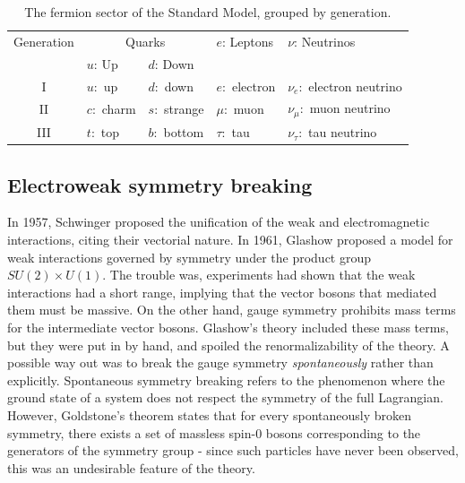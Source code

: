\begin{table}
  \raggedright
\strictpagecheck
\begin{adjustwidth}{-0.5in}{0in}
  \begin{tabular}{cllll}
    \toprule
    Generation & \multicolumn{2}{c}{Quarks} & $e$: Leptons & $\nu$: Neutrinos \\ \cmidrule(r){2-3}
     & $u$: Up & $d$: Down &                                       & \\\midrule
    I           & $u:$ up                    & $d:$ down     & $e:$ electron                         & $\nu_e:$ electron neutrino\\
    II          & $c:$ charm                 & $s:$ strange  & $\mu:$ muon                           & $\nu_\mu:$ muon neutrino\\
    III         & $t:$ top                   & $b:$ bottom   & $\tau:$ tau                           & $\nu_\tau:$ tau neutrino\\
    \bottomrule
  \end{tabular}
  \caption{The fermion sector of the Standard Model, grouped by generation.}
  \label{tab:fermion_generations}
\end{adjustwidth}
\end{table}
\subsection{Electroweak symmetry breaking}\label{subsec:ewsb}
In 1957, Schwinger proposed the unification of the weak and electromagnetic interactions, citing their vectorial nature. In 1961, Glashow proposed a model for weak interactions governed by symmetry under the product group $SU(2)\times U(1)$. The trouble was, experiments had shown that the weak interactions had a short range, implying that the vector bosons that mediated them must be massive. On the other hand, gauge symmetry prohibits mass terms for the intermediate vector bosons. Glashow's theory included these mass terms, but they were put in by hand, and spoiled the renormalizability of the theory. A possible way out was to break the gauge symmetry \emph{spontaneously} rather than explicitly. Spontaneous symmetry breaking refers to the phenomenon where the ground state of a system does not respect the symmetry of the full Lagrangian. However, Goldstone's theorem states that for every spontaneously broken symmetry, there exists a set of massless spin-0 bosons corresponding to the generators of the symmetry group - since such particles have never been observed, this was an undesirable feature of the theory. 


